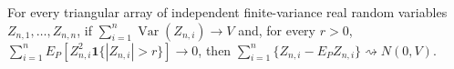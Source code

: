 For every triangular array of independent finite-variance real random variables \(Z_{n,1},\ldots,Z_{n,n}\), if \(\sum_{i=1}^n\operatorname{Var}(Z_{n,i})\to V\) and, for every \(r>0\), \(\sum_{i=1}^nE_P[Z_{n,i}^2\mathbf 1\{|Z_{n,i}|>r\}]\to0\), then \(\sum_{i=1}^n\{Z_{n,i}-E_PZ_{n,i}\}\rightsquigarrow N(0,V)\).